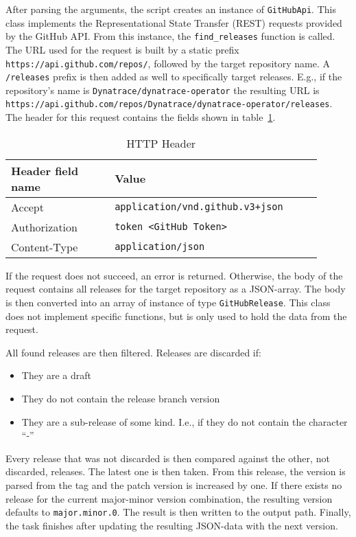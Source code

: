 After parsing the arguments, the script creates an instance of \verb|GitHubApi|.
This class implements the Representational State Transfer (REST) requests provided by the GitHub API.
From this instance, the \verb|find_releases| function is called.
The URL used for the request is built by a static prefix \verb|https://api.github.com/repos/|, followed by the target repository name.
A \verb|/releases| prefix is then added as well to specifically target releases.
E.g., if the repository's name is \verb|Dynatrace/dynatrace-operator| the resulting URL is \verb|https://api.github.com/repos/Dynatrace/dynatrace-operator/releases|.
The header for this request contains the fields shown in table~\ref{tab:http-header}.

\begin{table}[H]
    \centering
    \caption{HTTP Header}
    \label{tab:http-header}
    \begin{tabular}{p{0.3\linewidth}|p{0.6\linewidth}}
        Header field name & Value \\
        \hline
        Accept & \verb|application/vnd.github.v3+json| \\
        Authorization & \verb|token <GitHub Token>| \\
        Content-Type & \verb|application/json| \\
    \end{tabular}
\end{table}

If the request does not succeed, an error is returned.
Otherwise, the body of the request contains all releases for the target repository as a JSON-array.
The body is then converted into an array of instance of type \verb|GitHubRelease|.
This class does not implement specific functions, but is only used to hold the data from the request.

All found releases are then filtered.
Releases are discarded if:
\begin{itemize}
    \item They are a draft
    \item They do not contain the release branch version
    \item They are a sub-release of some kind.
        I.e., if they do not contain the character ``-''
\end{itemize}

Every release that was not discarded is then compared against the other, not discarded, releases.
The latest one is then taken.
From this release, the version is parsed from the tag and the patch version is increased by one.
If there exists no release for the current major-minor version combination, the resulting version defaults to \verb|major.minor.0|.
The result is then written to the output path.
Finally, the task finishes after updating the resulting JSON-data with the next version.
